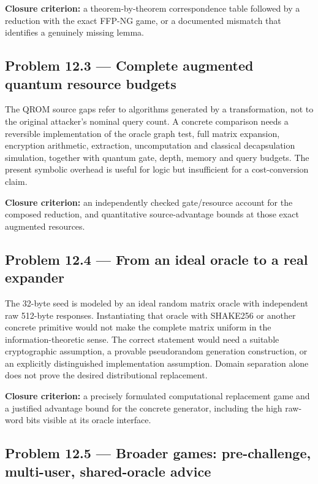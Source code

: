 \documentclass[
  11pt,
  a4paper,
  oneside]{report}
\begin{document}
\textbf{Closure criterion:} a theorem-by-theorem correspondence table
followed by a reduction with the exact FFP-NG game, or a documented
mismatch that identifies a genuinely missing lemma.

\subsection{Problem 12.3 --- Complete augmented quantum resource
budgets}\label{problem-12.3-complete-augmented-quantum-resource-budgets}

The QROM source gaps refer to algorithms generated by a transformation,
not to the original attacker's nominal query count. A concrete
comparison needs a reversible implementation of the oracle graph test,
full matrix expansion, encryption arithmetic, extraction, uncomputation
and classical decapsulation simulation, together with quantum gate,
depth, memory and query budgets. The present symbolic overhead is useful
for logic but insufficient for a cost-conversion claim.

\textbf{Closure criterion:} an independently checked gate/resource
account for the composed reduction, and quantitative source-advantage
bounds at those exact augmented resources.

\subsection{Problem 12.4 --- From an ideal oracle to a real
expander}\label{problem-12.4-from-an-ideal-oracle-to-a-real-expander}

The 32-byte seed is modeled by an ideal random matrix oracle with
independent raw 512-byte responses. Instantiating that oracle with
SHAKE256 or another concrete primitive would not make the complete
matrix uniform in the information-theoretic sense. The correct statement
would need a suitable cryptographic assumption, a provable pseudorandom
generation construction, or an explicitly distinguished implementation
assumption. Domain separation alone does not prove the desired
distributional replacement.

\textbf{Closure criterion:} a precisely formulated computational
replacement game and a justified advantage bound for the concrete
generator, including the high raw-word bits visible at its oracle
interface.

\subsection{Problem 12.5 --- Broader games: pre-challenge, multi-user,
shared-oracle
advice}\label{problem-12.5-broader-games-pre-challenge-multi-user-shared-oracle-advice}
\end{document}
